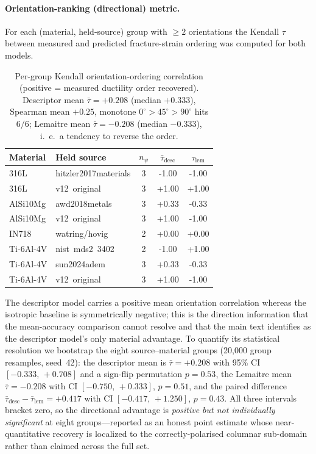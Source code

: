 \documentclass[11pt,a4paper,twocolumn]{article}
\begin{document}
\paragraph{Orientation-ranking (directional) metric.}
For each (material, held-source) group with $\ge 2$ orientations the Kendall $\tau$ between measured and
predicted fracture-strain ordering was computed for both models.

\begin{table}[htbp]
\centering
\caption{Per-group Kendall orientation-ordering correlation (positive = measured ductility order recovered).
Descriptor mean $\bar\tau = +0.208$ (median $+0.333$), Spearman mean $+0.25$, monotone $0^\circ\!>\!45^\circ\!>\!90^\circ$
hits $6/6$; Lemaitre mean $\bar\tau = -0.208$ (median $-0.333$), i.~e.\ a tendency to reverse the order.}
\label{tab:si_ranking}
\footnotesize
\setlength{\tabcolsep}{2pt}
\begin{tabular}{llc cc}
\toprule
\textbf{Material} & \textbf{Held source} & $n_\psi$ & $\bar\tau_{\mathrm{desc}}$ & $\tau_{\mathrm{lem}}$ \\
\midrule
316L & hitzler2017materials & 3 & -1.00 & -1.00 \\
316L & v12~original & 3 & +1.00 & +1.00 \\
AlSi10Mg & awd2018metals & 3 & +0.33 & -0.33 \\
AlSi10Mg & v12~original & 3 & +1.00 & -1.00 \\
IN718 & watring/hovig & 2 & +0.00 & +0.00 \\
Ti-6Al-4V & nist~mds2~3402 & 2 & -1.00 & +1.00 \\
Ti-6Al-4V & sun2024adem & 3 & +0.33 & -0.33 \\
Ti-6Al-4V & v12~original & 3 & +1.00 & -1.00 \\
\bottomrule
\end{tabular}
\end{table}

The descriptor model carries a positive mean orientation correlation whereas the isotropic baseline is
symmetrically negative; this is the direction information that the mean-accuracy comparison cannot resolve and
that the main text identifies as the descriptor model's only material advantage. To quantify its statistical
resolution we bootstrap the eight source--material groups (20{,}000 group resamples, seed~42): the descriptor mean
is $\bar\tau = +0.208$ with 95\% CI $[-0.333,\,+0.708]$ and a sign-flip permutation $p = 0.53$, the Lemaitre mean
$\bar\tau = -0.208$ with CI $[-0.750,\,+0.333]$, $p = 0.51$, and the paired difference
$\bar\tau_{\mathrm{desc}} - \bar\tau_{\mathrm{lem}} = +0.417$ with CI $[-0.417,\,+1.250]$, $p = 0.43$. All three
intervals bracket zero, so the directional advantage is \emph{positive but not individually significant} at eight
groups---reported as an honest point estimate whose near-quantitative recovery is localized to the
correctly-polarised columnar sub-domain rather than claimed across the full set.
\end{document}
